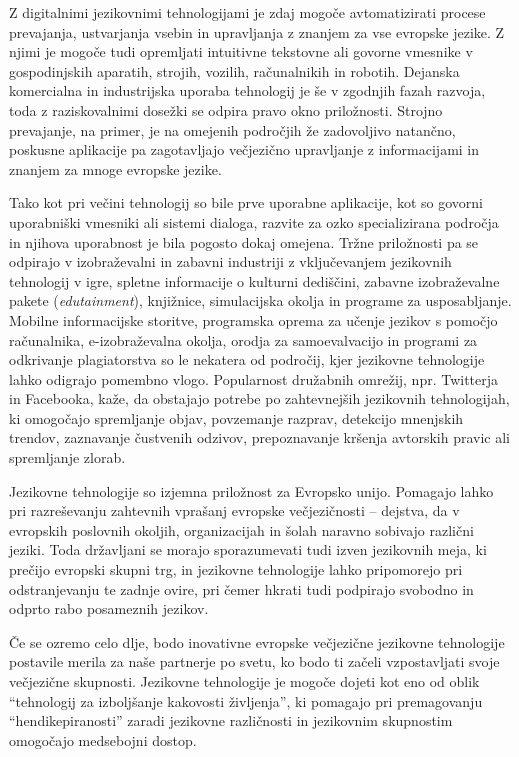 \begin{multicols}{2}
Z digitalnimi jezikovnimi tehnologijami je zdaj mogoče avtomatizirati procese prevajanja, ustvarjanja vsebin in upravljanja z znanjem za vse evropske jezike. Z njimi je mogoče tudi oprem\-ljati intuitivne tekstovne ali govorne vmesnike v gospodinjskih aparatih, strojih, vozilih, računalnikih in robotih. Dejanska komercialna in industrijska uporaba tehnologij je še v zgodnjih fazah razvoja, toda z raziskovalnimi dosežki se odpira pravo okno priložnosti. Strojno prevajanje, na primer, je na omejenih področjih že zadovoljivo natančno, poskusne aplikacije pa zagotavljajo večjezično upravljanje z informacijami in znanjem za mnoge evropske jezike. 

Tako kot pri večini tehnologij so bile prve uporabne aplikacije, kot so govorni uporabniški vmesniki ali sistemi dialoga, razvite za ozko specializirana področja in njihova uporabnost je bila pogosto dokaj omejena. Tržne priložnosti pa se odpirajo v izobraževalni in zabavni industriji z vključevanjem jezikovnih tehnologij v igre, spletne informacije o kulturni dediščini, zabavne izobraževalne pakete (\textit{edutainment}), knjižnice, simulacijska okolja in programe za usposabljanje. Mobilne informacijske storitve, programska oprema za učenje jezikov s pomočjo računalnika, e-izobraževalna okolja, orodja za samoevalvacijo in programi za odkrivanje plagiatorstva so le nekatera od področij, kjer jezikovne tehnologije lahko odigrajo pomembno vlogo. Popularnost družabnih omrežij, npr. Twitterja in Facebooka, kaže, da obstajajo potrebe po zahtevnej\-ših jezikovnih tehnologijah, ki omogočajo sprem\-ljanje objav, povzemanje razprav, detekcijo mnenj\-skih trendov, zaznavanje čustvenih odzivov, prepoznavanje kršenja avtorskih pravic ali spremljanje zlorab. 

Jezikovne tehnologije so izjemna priložnost za Evropsko unijo. Pomagajo lahko pri razreševanju zahtevnih vprašanj evropske večjezičnosti – dejstva, da v evropskih poslovnih okoljih, organizacijah in šolah naravno sobivajo različni jeziki. Toda držav\-ljani se morajo sporazumevati tudi izven jezikovnih meja, ki prečijo evropski skupni trg, in jezikovne tehnologije lahko pripomorejo pri odstranjevanju te zadnje ovire, pri čemer hkrati tudi podpirajo svobodno in odprto rabo posameznih jezikov. 


Če se ozremo celo dlje, bodo inovativne evropske večjezične jezikovne tehnologije postavile merila za naše partnerje po svetu, ko bodo ti začeli vzpostavljati svoje večjezične skupnosti. Jezikovne tehnologije je mogoče dojeti kot eno od oblik “tehnologij za izboljšanje kakovosti življenja”, ki pomagajo pri premagovanju “hendikepiranosti” zaradi jezikovne različnosti in jezikovnim skupnostim omogočajo medsebojni dostop.


\end{multicols}
